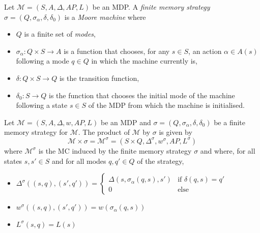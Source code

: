 \begin{definition}
Let $\mathcal{M} = (S, A, \Delta, AP, L)$ be an MDP.
A \textit{finite memory strategy} $\sigma = (Q, \sigma_\alpha, \delta, \delta_0)$ is a \textit{Moore machine} where
\begin{itemize}
	\item $Q$ is a finite set of \textit{modes},
	\item $\sigma_\alpha: Q \times S \rightarrow A$ is a function that chooses, for any $s \in S$, an action $\alpha \in A(s)$ following a mode $q \in Q$ in which the machine currently is,
	\item $\delta: Q \times S \rightarrow Q$ is the transition function,
	\item $\delta_0: S \rightarrow Q$ is the function that chooses the initial mode of the machine following a state $s \in S$ of the MDP from which the machine is initialised.
\end{itemize}
\end{definition}

\begin{definition}
Let $\mathcal{M} = (S, A, \Delta, w, AP, L)$ be an MDP and $\sigma = (Q, \sigma_\alpha, \delta, \delta_0)$ be a finite memory strategy for $\mathcal{M}$.
The product of $\mathcal{M}$ by $\sigma$ is given by
\[ \mathcal{M} \times \sigma = \mathcal{M}^\sigma = (S \times Q, \Delta^\sigma, w^\sigma, AP, L^\sigma) \]
where $\mathcal{M}^\sigma$ is the MC induced by the finite memory strategy $\sigma$ and where,
for all states $s, s' \in S$ and for all modes $q, q' \in Q$ of the strategy,
\begin{itemize}
	\item $\Delta^\sigma((s, q), (s', q')) =
	\begin{cases}
	\Delta(s, \sigma_\alpha(q, s), s') & \text{if } \delta(q, s) = q'\\
	0  & \text{else}
	\end{cases}$
  \item $w^\sigma((s, q), (s', q')) = w(\sigma_\alpha(q, s))$
  \item $L^\sigma(s, q) = L(s)$
\end{itemize}
\end{definition}

